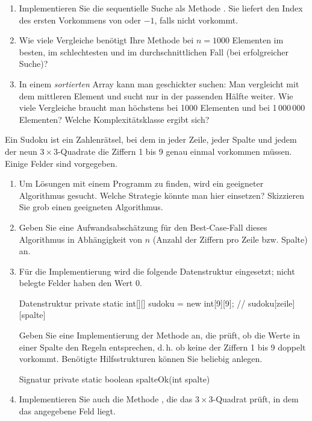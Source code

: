 \begin{enumerate}[label=\alph*)]
\item Implementieren Sie die sequentielle Suche als Methode . Sie liefert den Index des ersten Vorkommens von  oder $-1$, falls  nicht vorkommt.
\item Wie viele Vergleiche benötigt Ihre Methode bei $n = 1000$ Elementen im besten, im schlechtesten und im durchschnittlichen Fall (bei erfolgreicher Suche)?
\item[\S\ c)] In einem \emph{sortierten} Array kann man geschickter suchen: Man vergleicht mit dem mittleren Element und sucht nur in der passenden Hälfte weiter. Wie viele Vergleiche braucht man höchstens bei 1000 Elementen und bei 1\,000\,000 Elementen? Welche Komplexitätsklasse ergibt sich?
\end{enumerate}

Ein Sudoku ist ein Zahlenrätsel, bei dem in jeder Zeile, jeder Spalte und jedem der neun $3 \times 3$-Quadrate die Ziffern 1 bis 9 genau einmal vorkommen müssen. Einige Felder sind vorgegeben.
\begin{enumerate}[label=\alph*)]
\item Um Lösungen mit einem Programm zu finden, wird ein geeigneter Algorithmus gesucht. Welche Strategie könnte man hier einsetzen? Skizzieren Sie grob einen geeigneten Algorithmus.
\item Geben Sie eine Aufwandsabschätzung für den Best-Case-Fall dieses Algorithmus in Abhängigkeit von $n$ (Anzahl der Ziffern pro Zeile bzw. Spalte) an.
\item Für die Implementierung wird die folgende Datenstruktur eingesetzt; nicht belegte Felder haben den Wert 0.
\begin{javacode}[Ausschnitt]{Datenstruktur}
private static int[][] sudoku = new int[9][9];      // sudoku[zeile][spalte]
\end{javacode}
Geben Sie eine Implementierung der Methode  an, die prüft, ob die Werte in einer Spalte den Regeln entsprechen, d.\,h. ob keine der Ziffern 1 bis 9 doppelt vorkommt. Benötigte Hilfsstrukturen können Sie beliebig anlegen.
\begin{javacode}[Ausschnitt]{Signatur}
private static boolean spalteOk(int spalte)
\end{javacode}
\item[\S\ d)] Implementieren Sie auch die Methode , die das $3 \times 3$-Quadrat prüft, in dem das angegebene Feld liegt.
\end{enumerate}

